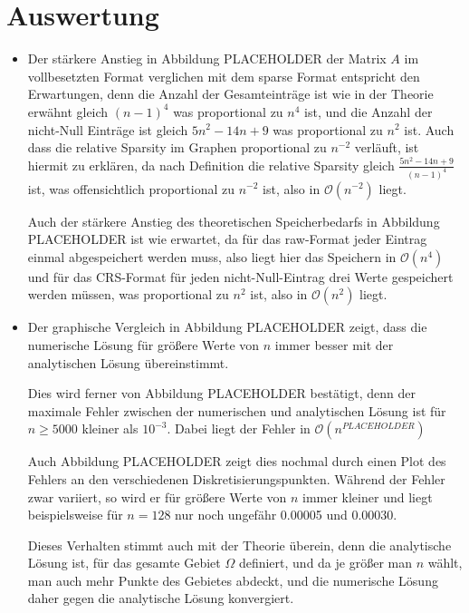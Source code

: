 \documentclass{scrartcl}
\theoremstyle{remark}
\begin{document}
\section{Auswertung}


\begin{itemize}
  \item Der stärkere Anstieg in Abbildung PLACEHOLDER %
        der Matrix \(A\) im vollbesetzten Format verglichen mit dem sparse Format
        entspricht den Erwartungen, denn die Anzahl der Gesamteinträge ist wie in der Theorie erwähnt
        gleich \((n - 1)^{4}\) was proportional zu \(n^4\) ist, und die Anzahl der nicht-Null Einträge
        ist gleich \(5n^2 - 14n + 9\) was proportional zu \(n^2\) ist.
        Auch dass die relative Sparsity im Graphen proportional zu \(n^{-2}\) verläuft, ist hiermit zu erklären,
        da nach Definition die relative Sparsity gleich \(\frac{5n^2 - 14n + 9}{(n - 1)^{4}}\) ist, was offensichtlich
        proportional zu \(n^{-2}\) ist, also in \(\mathcal{O}(n^{-2})\) liegt.

        Auch der stärkere Anstieg des theoretischen Speicherbedarfs in Abbildung PLACEHOLDER %
        ist wie erwartet, da für das raw-Format jeder Eintrag einmal abgespeichert werden muss, also liegt hier das Speichern in
        \(\mathcal{O}(n^4)\) und für das CRS-Format für jeden nicht-Null-Eintrag drei Werte gespeichert werden müssen, was proportional zu
        \(n^2\) ist, also in \(\mathcal{O}(n^2)\) liegt.

  \item Der graphische Vergleich in Abbildung PLACEHOLDER %
        zeigt, dass die numerische Lösung für größere Werte von \(n\) immer besser
        mit der analytischen Lösung übereinstimmt.

        Dies wird ferner von Abbildung PLACEHOLDER %
        bestätigt, denn der maximale Fehler zwischen der numerischen und analytischen Lösung
        ist für \(n \geqslant 5000\) kleiner als \(10^{-3}\).
        Dabei liegt der Fehler in \(\mathcal{O}(n^{PLACEHOLDER})\) %

        Auch Abbildung PLACEHOLDER %
        zeigt dies nochmal durch einen Plot des Fehlers an den verschiedenen Diskretisierungspunkten.
        Während der Fehler zwar variiert, so wird er für größere Werte von \(n\) immer kleiner und liegt beispielsweise
        für \(n = 128\) nur noch ungefähr 0.00005 und 0.00030. 

        Dieses Verhalten stimmt auch mit der Theorie überein, denn die analytische Lösung ist, für das gesamte Gebiet \(\Omega\) definiert,
        und da je größer man \(n\) wählt, man auch mehr Punkte des Gebietes abdeckt, und die numerische Lösung daher gegen die
        analytische Lösung konvergiert.

\end{itemize}
\end{document}
